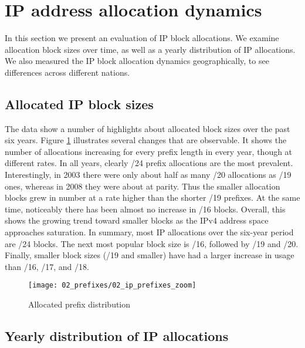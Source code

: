 \section{IP address allocation dynamics}
\label{sec:allocations}

In this section we present an evaluation of IP block allocations. We examine 
allocation block sizes over time, as well as a yearly distribution of IP 
allocations. We also measured the IP block allocation dynamics geographically,
to see differences across different nations.

\subsection{Allocated IP block sizes}

The data show a number of highlights about allocated block sizes over the past
six years. Figure \ref{fig:IP allocations} illustrates several changes that
are observable. It shows the number of allocations increasing for every prefix
length in every year, though at different rates. In all years, clearly /24
prefix allocations are the most prevalent. Interestingly, in 2003 there were
only about half as many /20 allocations as /19 ones, whereas in 2008 they were
about at parity. Thus the smaller allocation blocks grew in number at a rate
higher than the shorter /19 prefixes. At the same time, noticeably there has
been almost no increase in /16 blocks. Overall, this shows the growing trend
toward smaller blocks as the IPv4 address space approaches saturation. In
summary, most IP allocations over the six-year period are /24 blocks. The next
most popular block size is /16, followed by /19 and /20. Finally, smaller
block sizes (/19 and smaller) have had a larger increase in usage than /16,
/17, and /18.

\begin{figure}[htbp]
 	\centering
 		\texttt{[image: 02\_prefixes/02\_ip\_prefixes\_zoom]}
	\caption{Allocated prefix distribution}
 	\label{fig:IP allocations}
\end{figure}

\subsection{Yearly distribution of IP allocations}


